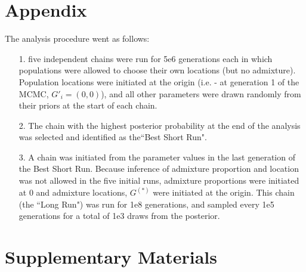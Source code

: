 \documentclass[12pt]{article}
\newcommand{\admixsource}[1]{{$G^{(*)}$}}
\begin{document}

\section*{Appendix}

The analysis procedure went as follows: 
\begin{itemize}
\item[1.] five independent chains were run for 5e6 generations each in which populations were allowed to choose their own locations (but no admixture).  Population locations were initiated at the origin (i.e. - at generation 1 of the MCMC, $G'_i = (0,0)$), and all other parameters were drawn randomly from their priors at the start of each chain.  
%
\item[2.]The chain with the highest posterior probability at the end of the analysis was selected and identified as the``Best Short Run".
%
\item[3.] A chain was initiated from the parameter values in the last generation of the Best Short Run.  Because inference of admixture proportion and location was not allowed in the five initial runs, admixture proportions were initiated at 0 and admixture locations, \admixsource{G} were initiated at the origin.  This  chain (the ``Long Run") was run for 1e8 generations, and sampled every 1e5 generations for a total of 1e3 draws from the posterior.
\end{itemize}

\newpage


\section*{Supplementary Materials}
\end{document}
